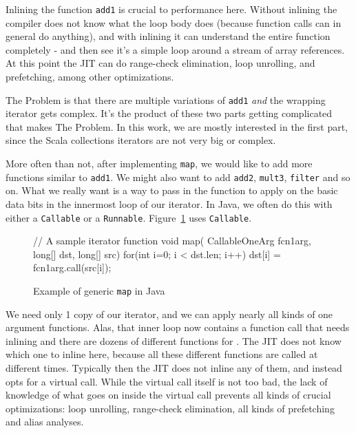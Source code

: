 Inlining the function \texttt{add1} is crucial to performance here.  Without
inlining the compiler does not know what the loop body does (because function
calls can in general do anything), and with inlining it can understand the
entire function completely - and then see it's a simple loop around a stream of
array references.  At this point the JIT can do range-check elimination, loop
unrolling, and prefetching, among other optimizations.

The Problem is that there are multiple variations of \texttt{add1} \emph{and}
the wrapping iterator gets complex.  It's the product of these two parts getting
complicated that makes The Problem. In this work, we are mostly interested in
the first part, since the Scala collections iterators are not very big or
complex.

More often than not, after implementing \texttt{map}, we would like to add more
functions similar to \texttt{add1}. We might also want to add \texttt{add2}, \texttt{mult3},
\texttt{filter} and so on. What we really want is a way to pass in the function to
apply on the basic data bits in the innermost loop of our iterator. In Java, we often do this with either a \texttt{Callable} or a \texttt{Runnable}. Figure~\ref{java_generic_map} uses \texttt{Callable}.

\begin{figure}
\begin{javaCode}
// A sample iterator function
void map( CallableOneArg fcn1arg, long[] dst, long[] src) {
  for(int i=0; i < dst.len; i++)
    dst[i] = fcn1arg.call(src[i]);
}
\end{javaCode}
\caption[Example of generic \texttt{map} in Java]{Example of generic \texttt{map} in Java}
\label{java_generic_map}
\end{figure}
  
We need only 1 copy of our iterator, and we can apply nearly all kinds of one
argument functions. Alas, that inner loop now contains a function call that
needs inlining and there are dozens of different functions for .
The JIT does not know which one to inline here, because all these different
functions are called at different times.  Typically then the JIT does not inline
any of them, and instead opts for a virtual call.  While the virtual call
itself is not too bad, the lack of knowledge of what goes on inside the virtual
call prevents all kinds of crucial optimizations: loop unrolling, range-check
elimination, all kinds of prefetching and alias analyses.

